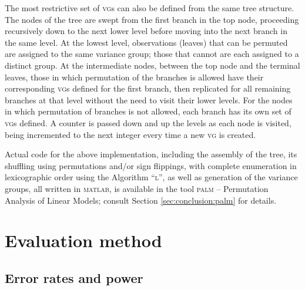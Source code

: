 The most restrictive set of \textsc{vg}s can also be defined from the same tree structure. The nodes of the tree are swept from the first branch in the top node, proceeding recursively down to the next lower level before moving into the next branch in the same level. At the lowest level, observations (leaves) that can be permuted are assigned to the same variance group; those that cannot are each assigned to a distinct group. At the intermediate nodes, between the top node and the terminal leaves, those in which permutation of the branches is allowed have their corresponding \textsc{vg}s defined for the first branch, then replicated for all remaining branches at that level without the need to visit their lower levels. For the nodes in which permutation of branches is not allowed, each branch has its own set of \textsc{vg}s defined. A counter is passed down and up the levels as each node is visited, being incremented to the next integer every time a new \textsc{vg} is created.

Actual code for the above implementation, including the assembly of the tree, its shuffling using permutations and/or sign flippings, with complete enumeration in lexicographic order using the Algorithm ``\textsc{l}'', as well as generation of the variance groups, all written in \textsc{matlab}, is available in the tool \textsc{palm} -- Permutation Analysis of Linear Models; consult Section \ref{sec:conclusion:palm} for details.

\section{Evaluation method}
\label{sec:ptree:evaluation}

\subsection{Error rates and power}

